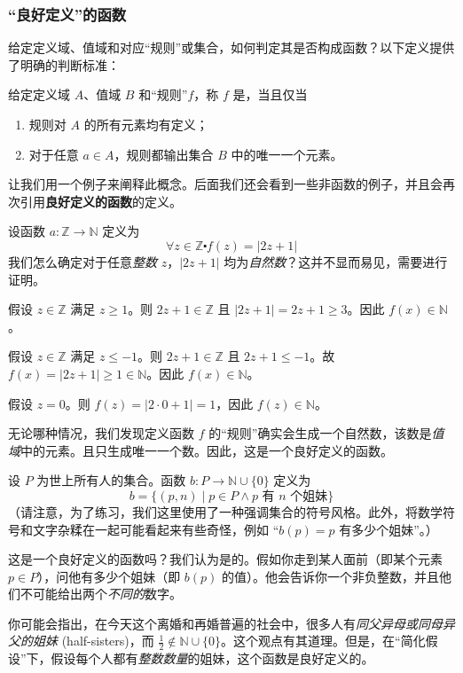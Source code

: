 \subsubsection*{``良好定义''的函数}

给定定义域、值域和对应``规则''或集合，如何判定其是否构成函数？以下定义提供了明确的判断标准：

\begin{definition}\label{def:definition7.2.5}
    给定定义域 $A$、值域 $B$ 和``规则''$f$，称 $f$ 是，当且仅当
    \begin{enumerate}[label=(\arabic*)]
        \item 规则对 $A$ 的所有元素均有定义；
        \item 对于任意 $a \in A$，规则都输出集合 $B$ 中的唯一一个元素。
    \end{enumerate}
\end{definition}

让我们用一个例子来阐释此概念。后面我们还会看到一些非函数的例子，并且会再次引用\textbf{良好定义的函数}的定义。\\

\begin{example}
    设函数 $a : \mathbb{Z} \to \mathbb{N}$ 定义为
    \[\forall z \in \mathbb{Z} \centerdot f(z) = |2z + 1|\]
    我们怎么确定对于任意\emph{整数} $z$，$|2z + 1|$ 均为\emph{自然数}？这并不显而易见，需要进行证明。

    假设 $z \in \mathbb{Z}$ 满足 $z \ge 1$。则 $2z+1 \in \mathbb{Z}$ 且 $|2z+1| = 2z+1 \ge 3$。因此 $f(x) \in \mathbb{N}$。

    假设 $z \in \mathbb{Z}$ 满足 $z \le -1$。则 $2z+1 \in \mathbb{Z}$ 且 $2z+1 \le -1$。故 $f(x) = |2z + 1| \ge 1 \in \mathbb{N}$。因此 $f(x) \in \mathbb{N}$。

    假设 $z = 0$。则 $f(z) = |2 \cdot 0 + 1| = 1$，因此 $f(z) \in \mathbb{N}$。

    无论哪种情况，我们发现定义函数 $f$ 的``规则''确实会生成一个自然数，该数是\emph{值域}中的元素。且只生成唯一一个数。因此，这是一个良好定义的函数。
\end{example}

\begin{example}
    设 $P$ 为世上所有人的集合。函数 $b : P \to \mathbb{N} \cup \{0\}$ 定义为
    \[b = \{(p, n) \mid p \in P \land p \text{\ 有\ } n \text{\ 个姐妹}\}\]
    （请注意，为了练习，我们这里使用了一种强调集合的符号风格。此外，将数学符号和文字杂糅在一起可能看起来有些奇怪，例如 ``$b(p) = p \text{\ 有多少个姐妹}$''。）

    这是一个良好定义的函数吗？我们认为是的。假如你走到某人面前（即某个元素 $p \in P$），问他有多少个姐妹（即 $b(p)$ 的值）。他会告诉你一个非负整数，并且他们不可能给出两个\emph{不同的}数字。

    你可能会指出，在今天这个离婚和再婚普遍的社会中，很多人有\emph{同父异母或同母异父的姐妹} (half-sisters)，而 $\frac{1}{2} \notin \mathbb{N} \cup \{0\}$。这个观点有其道理。但是，在``简化假设''下，假设每个人都有\emph{整数数量}的姐妹，这个函数是良好定义的。
\end{example}

